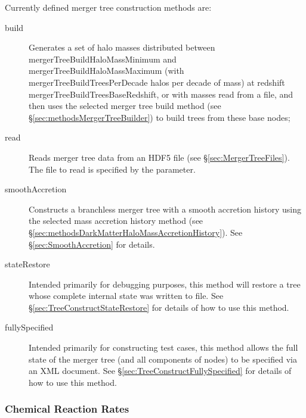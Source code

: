 Currently defined merger tree construction methods are:
\begin{description}
 \item [{\normalfont \ttfamily build}] Generates a set of halo masses distributed between {\normalfont \ttfamily mergerTreeBuildHaloMassMinimum} and {\normalfont \ttfamily mergerTreeBuildHaloMassMaximum} (with {\normalfont \ttfamily mergerTreeBuildTreesPerDecade} halos per decade of mass) at redshift {\normalfont \ttfamily mergerTreeBuildTreesBaseRedshift}, or with masses read from a file, and then uses the selected merger tree build method (see \S\ref{sec:methodsMergerTreeBuilder}) to build trees from these base nodes;
 \item [{\normalfont \ttfamily read}] Reads merger tree data from an HDF5 file (see \S\ref{sec:MergerTreeFiles}). The file to read is specified by the {\normalfont \ttfamily [mergerTreeReadFileName]} parameter.
 \item [{\normalfont \ttfamily smoothAccretion}] Constructs a branchless merger tree with a smooth accretion history using the selected mass accretion history method (see \S\ref{sec:methodsDarkMatterHaloMassAccretionHistory}). See \S\ref{sec:SmoothAccretion} for details.
 \item [{\normalfont \ttfamily stateRestore}] Intended primarily for debugging purposes, this method will restore a tree whose complete internal state was written to file. See \S\ref{sec:TreeConstructStateRestore} for details of how to use this method.
 \item [{\normalfont \ttfamily fullySpecified}] Intended primarily for constructing test cases, this method allows the full state of the merger tree (and all components of nodes) to be specified via an XML document. See \S\ref{sec:TreeConstructFullySpecified} for details of how to use this method.
\end{description}

\subsubsection{Chemical Reaction Rates}


